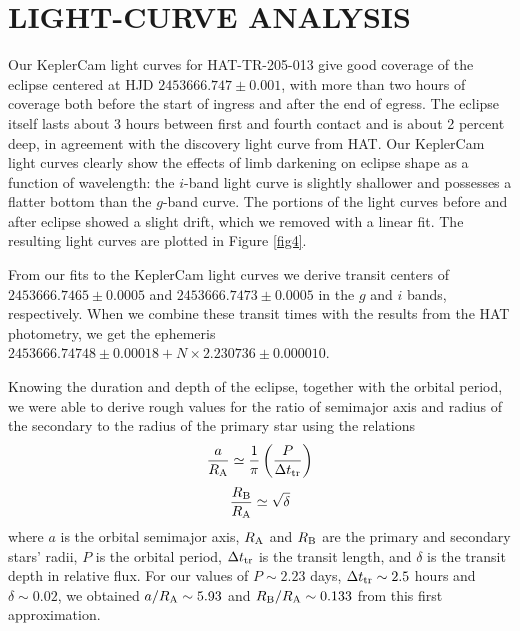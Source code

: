 \documentclass[12pt, preprint]{aastex}
\begin{document}
\section{LIGHT-CURVE ANALYSIS}

Our KeplerCam light curves for HAT-TR-205-013 give good coverage of
the eclipse centered at HJD $2453666.747 \pm 0.001$, with more than two
hours of coverage both before the start of ingress and after the end of
egress. The eclipse itself lasts about 3 hours between first and
fourth contact and is about 2 percent deep, in agreement with the
discovery light curve from HAT.  Our KeplerCam light curves clearly
show the effects of limb darkening on eclipse shape as a function of
wavelength: the $i$-band light curve is slightly shallower and possesses
a flatter bottom than the $g$-band curve. The portions of the light
curves before and after eclipse showed a slight drift, which we
removed with a linear fit. The resulting light curves are plotted
in Figure \ref{fig4}.

From our fits to the KeplerCam light curves we derive transit centers
of $2453666.7465 \pm 0.0005$ and $2453666.7473 \pm 0.0005$ in the $g$ and
$i$ bands, respectively. When we combine these transit times with the
results from the HAT photometry, we get the ephemeris $2453666.74748
\pm 0.00018 + N \times 2.230736 \pm 0.000010$.

Knowing the duration and depth of the eclipse, together with the
orbital period, we were able to derive rough values for the ratio of
semimajor axis and radius of the secondary to the radius of the
primary star using the relations
\begin{equation}\label{eq:10}
\frac{a}{R_{\rm A}} \simeq \frac{1}{\pi} \left(\frac{P}{\Delta t_{\rm tr}}\right)
\end{equation}
\begin{equation}
\frac{R_{\rm B}}{R_{\rm A}} \simeq \sqrt{\delta}
\end{equation}
where $a$ is the orbital semimajor axis, $R_{\rm A}$ and $R_{\rm B}$
are the primary and secondary stars' radii, $P$ is the orbital period,
$\Delta t_{\rm tr}$ is the transit length, and $\delta$ is the
transit depth in relative flux. For our values of $P \sim 2.23$ days,
$\Delta t_{\rm tr} \sim 2.5$ hours and $\delta \sim 0.02$, we obtained
$a/R_{\rm A} \sim 5.93$ and $R_{\rm B}/R_{\rm A} \sim 0.133$ from this
first approximation.
\end{document}
